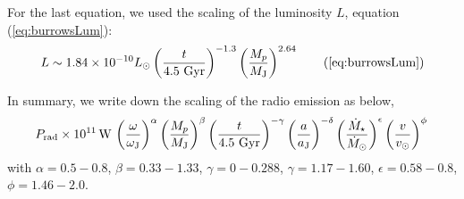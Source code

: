 \documentclass[iop,numberedappendix,apj]{emulateapj}
\begin{document}
For the last equation, we used the scaling of the luminosity $L$, equation (\ref{eq:burrowsLum}):
\begin{equation}
L \sim 1.84\times10^{-10} L_\odot \left( \frac{t}{4.5 \rm~Gyr} \right)^{-1.3} \left( \frac{M_p}{M_{\rm J}} \right)^{2.64} \tag{\ref{eq:burrowsLum}}
\end{equation} 

In summary, we write down the scaling of the radio emission as below, 
\begin{equation}
P_{\rm rad} \times 10^{11} \,{\rm W}\, \left( \frac{\omega}{\omega _{\rm J}} \right)^{\alpha } \left( \frac{M_p}{M_{\rm J}} \right)^{\beta }  \left( \frac{t}{4.5 \rm~Gyr} \right)^{-\gamma }  \left( \frac{a}{a_{\rm J}} \right)^{-\delta }  \left( \frac{\dot M_\star}{\dot M_{\odot}} \right)^{\epsilon } \left( \frac{v}{v_{\odot}} \right)^{\phi } \, \\
\end{equation} 
with $\alpha = 0.5-0.8$, $\beta = 0.33-1.33$, $\gamma = 0-0.288$, $\gamma = 1.17-1.60$, $\epsilon = 0.58-0.8$, $\phi = 1.46-2.0$. 
\end{document}
